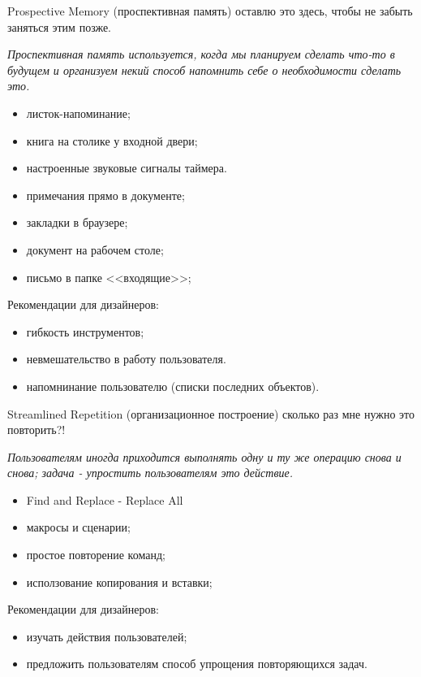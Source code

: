 \documentclass{beamer}
\begin{document}
\begin{frame}[t]	
	\begin{block}{Prospective Memory (проспективная память)}
		 оставлю это здесь, чтобы не забыть заняться этим позже.
	\end{block}	
	\textit{Проспективная память используется, когда мы планируем сделать что-то в будущем и организуем некий способ напомнить себе о необходимости сделать это.}
	\begin{itemize}
		\item листок-напоминание;
		\item книга на столике у входной двери;
		\item настроенные звуковые сигналы таймера.
		\item примечания прямо в документе;
		\item закладки в браузере;
		\item документ на рабочем столе;		
		\item письмо в папке <<входящие>>;				
	\end{itemize}
	Рекомендации для дизайнеров:
	\begin{itemize}
		\item гибкость инструментов;
		\item невмешательство в работу пользователя.
		\item напомнинание пользователю (списки последних объектов).
	\end{itemize}	
\end{frame}

\begin{frame}[t]	
	\begin{block}{Streamlined Repetition (организационное построение)}
		 сколько раз мне нужно это повторить?!
	\end{block}	
	\textit{Пользователям иногда приходится выполнять одну и ту же операцию снова и снова; задача - упростить пользователям это действие.}
	\begin{itemize}
		\item Find and Replace - Replace All
		\item макросы и сценарии;		
		\item простое повторение команд;
		\item исползование копирования и вставки;		
	\end{itemize}
	Рекомендации для дизайнеров:
	\begin{itemize}
		\item изучать действия пользователей;
		\item предложить пользователям способ упрощения повторяющихся задач.
	\end{itemize}	
\end{frame}
\end{document}
